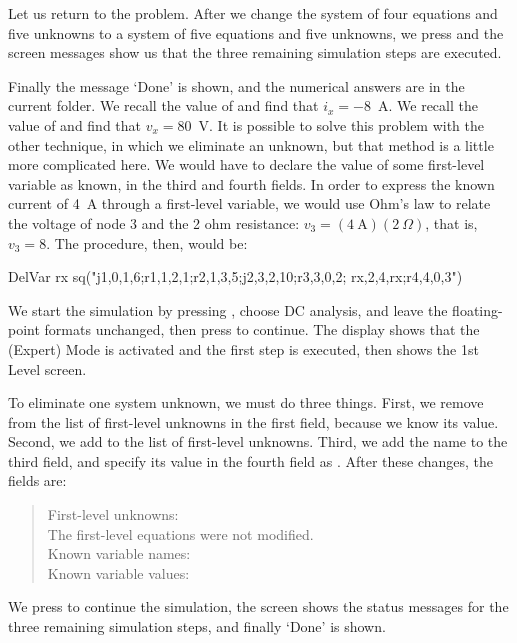 Let us return to the problem. After we change the system of four
equations and five unknowns to a system of five equations and five
unknowns, we press  and the screen messages show us that
the three remaining simulation steps are executed.

Finally the message `Done' is shown, and the numerical answers are
in the current folder. We recall the value of  and find
that $i_x = -8$~A. We recall the value of  and find that
$v_x = 80$~V. It is possible to solve this problem with the other
technique, in which we eliminate an unknown, but that method is a
little more complicated here. We would have to declare the value of
some first-level variable as known, in the third and fourth fields.
In order to express the known current of 4~A through a first-level
variable, we would use Ohm's law to relate the voltage of node 3 and
the 2 ohm resistance: $v_3 = (4~\mathrm{A})(2~\Omega)$, that is,
$v_3 = 8$. The procedure, then, would be:

\begin{entry}
DelVar rx
sq\expert("j1,0,1,6;r1,1,2,1;r2,1,3,5;j2,3,2,10;r3,3,0,2;
          rx,2,4,rx;r4,4,0,3")
\end{entry}

We start the simulation by pressing , choose DC analysis,
and leave the floating-point formats unchanged, then press
 to continue. The display shows that the (Expert) Mode is
activated and the first step is executed, then shows the 1st Level
screen.

To eliminate one system unknown, we must do three things. First, we
remove  from the list of first-level unknowns in the first
field, because we know its value. Second, we add  to the
list of first-level unknowns. Third, we add the name  to
the third field, and specify its value in the fourth field as
. After these changes, the fields are:

\begin{quote}
First-level unknowns: \\
The first-level equations were not modified.\\
Known variable names: \\
Known variable values: 
\end{quote}

We press  to continue the simulation, the screen shows
the status messages for the three remaining simulation steps, and
finally `Done' is shown.

